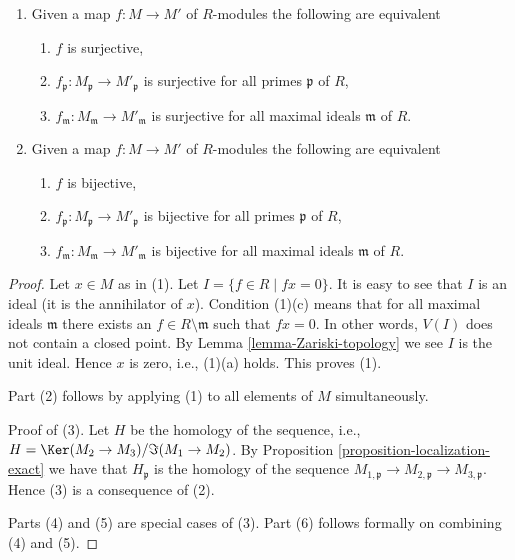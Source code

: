 \begin{lemma}
\begin{enumerate}
\begin{enumerate}
\item $f$ is injective,
\item $f_{\mathfrak p} : M_\mathfrak p \to M'_\mathfrak p$ is injective
for all primes $\mathfrak p$ of $R$,
\item $f_{\mathfrak m} : M_\mathfrak m \to M'_\mathfrak m$ is injective
for all maximal ideals $\mathfrak m$ of $R$.
\end{enumerate}
\item Given a map $f : M \to M'$ of $R$-modules the following are equivalent
\begin{enumerate}
\item $f$ is surjective,
\item $f_{\mathfrak p} : M_\mathfrak p \to M'_\mathfrak p$ is surjective
for all primes $\mathfrak p$ of $R$,
\item $f_{\mathfrak m} : M_\mathfrak m \to M'_\mathfrak m$ is surjective
for all maximal ideals $\mathfrak m$ of $R$.
\end{enumerate}
\item Given a map $f : M \to M'$ of $R$-modules the following are equivalent
\begin{enumerate}
\item $f$ is bijective,
\item $f_{\mathfrak p} : M_\mathfrak p \to M'_\mathfrak p$ is bijective
for all primes $\mathfrak p$ of $R$,
\item $f_{\mathfrak m} : M_\mathfrak m \to M'_\mathfrak m$ is bijective
for all maximal ideals $\mathfrak m$ of $R$.
\end{enumerate}
\end{enumerate}
\end{lemma}

\begin{proof}
Let $x \in M$ as in (1). Let $I = \{f \in R \mid fx = 0\}$.
It is easy to see that $I$ is an ideal (it is the
annihilator of $x$). Condition (1)(c) means that for
all maximal ideals $\mathfrak m$ there exists an
$f \in R \setminus \mathfrak m$ such that $fx =0$.
In other words, $V(I)$ does not contain a closed point.
By Lemma \ref{lemma-Zariski-topology} we see $I$ is the unit ideal.
Hence $x$ is zero, i.e., (1)(a) holds. This proves (1).

\medskip\noindent
Part (2) follows by applying (1) to all elements of $M$ simultaneously.

\medskip\noindent
Proof of (3). Let $H$ be the homology of the sequence, i.e.,
$H = \Ker(M_2 \to M_3)/\Im(M_1 \to M_2)$. By
Proposition \ref{proposition-localization-exact}
we have that $H_\mathfrak p$ is the homology of the sequence
$M_{1, \mathfrak p} \to M_{2, \mathfrak p} \to M_{3, \mathfrak p}$.
Hence (3) is a consequence of (2).

\medskip\noindent
Parts (4) and (5) are special cases of (3). Part (6) follows
formally on combining (4) and (5).
\end{proof}


